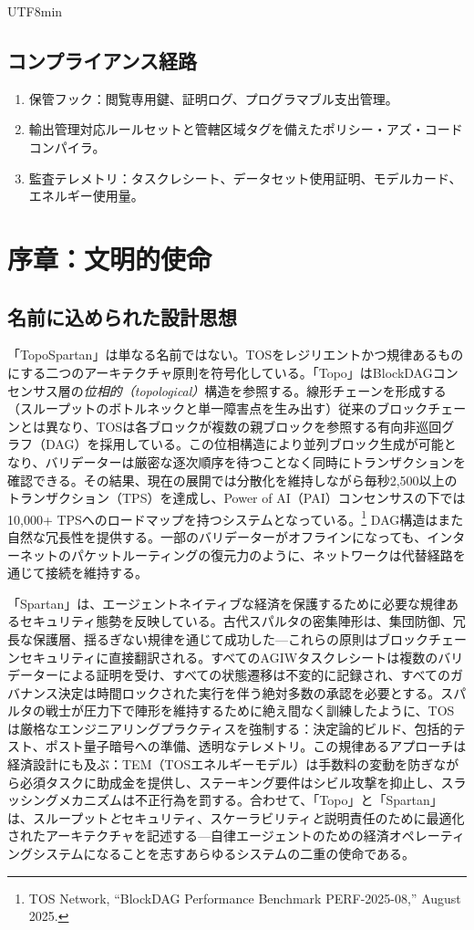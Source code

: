 \documentclass[11pt]{article}
\begin{document}
\begin{CJK}{UTF8}{min}
\subsection{コンプライアンス経路}
\begin{enumerate}[noitemsep]
  \item 保管フック：閲覧専用鍵、証明ログ、プログラマブル支出管理。
  \item 輸出管理対応ルールセットと管轄区域タグを備えたポリシー・アズ・コードコンパイラ。
  \item 監査テレメトリ：タスクレシート、データセット使用証明、モデルカード、エネルギー使用量。
\end{enumerate}

\section{序章：文明的使命}
\subsection{名前に込められた設計思想}
「TopoSpartan」は単なる名前ではない。TOSをレジリエントかつ規律あるものにする二つのアーキテクチャ原則を符号化している。「Topo」はBlockDAGコンセンサス層の\emph{位相的（topological）}構造を参照する。線形チェーンを形成する（スループットのボトルネックと単一障害点を生み出す）従来のブロックチェーンとは異なり、TOSは各ブロックが複数の親ブロックを参照する有向非巡回グラフ（DAG）を採用している。この位相構造により並列ブロック生成が可能となり、バリデーターは厳密な逐次順序を待つことなく同時にトランザクションを確認できる。その結果、現在の展開では分散化を維持しながら毎秒2,500以上のトランザクション（TPS）を達成し、Power of AI（PAI）コンセンサスの下では10,000+ TPSへのロードマップを持つシステムとなっている。\footnote{TOS Network, ``BlockDAG Performance Benchmark PERF-2025-08,'' August 2025.} DAG構造はまた自然な冗長性を提供する。一部のバリデーターがオフラインになっても、インターネットのパケットルーティングの復元力のように、ネットワークは代替経路を通じて接続を維持する。

「Spartan」は、エージェントネイティブな経済を保護するために必要な規律あるセキュリティ態勢を反映している。古代スパルタの密集陣形は、集団防御、冗長な保護層、揺るぎない規律を通じて成功した---これらの原則はブロックチェーンセキュリティに直接翻訳される。すべてのAGIWタスクレシートは複数のバリデーターによる証明を受け、すべての状態遷移は不変的に記録され、すべてのガバナンス決定は時間ロックされた実行を伴う絶対多数の承認を必要とする。スパルタの戦士が圧力下で陣形を維持するために絶え間なく訓練したように、TOSは厳格なエンジニアリングプラクティスを強制する：決定論的ビルド、包括的テスト、ポスト量子暗号への準備、透明なテレメトリ。この規律あるアプローチは経済設計にも及ぶ：TEM（TOSエネルギーモデル）は手数料の変動を防ぎながら必須タスクに助成金を提供し、ステーキング要件はシビル攻撃を抑止し、スラッシングメカニズムは不正行為を罰する。合わせて、「Topo」と「Spartan」は、スループット\emph{と}セキュリティ、スケーラビリティ\emph{と}説明責任のために最適化されたアーキテクチャを記述する---自律エージェントのための経済オペレーティングシステムになることを志すあらゆるシステムの二重の使命である。


\end{CJK}
\end{document}
